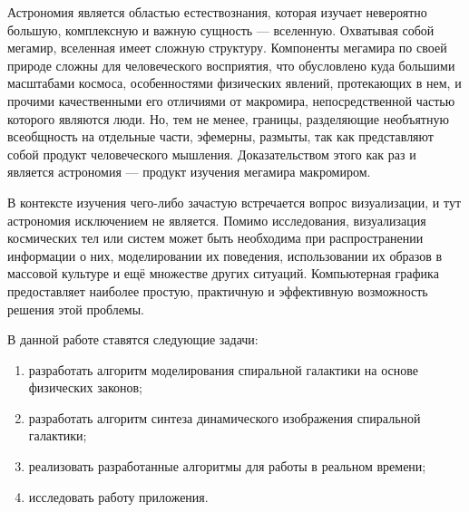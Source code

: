 \Introduction

Астрономия является областью естествознания, которая изучает невероятно большую, комплексную и важную сущность — вселенную. Охватывая собой мегамир, вселенная имеет сложную структуру. Компоненты мегамира по своей природе сложны для человеческого восприятия, что обусловлено куда большими масштабами космоса, особенностями физических явлений, протекающих в нем, и прочими качественными его отличиями от макромира, непосредственной частью которого являются люди. Но, тем не менее, границы, разделяющие необъятную всеобщность на отдельные части, эфемерны, размыты, так как представляют собой продукт человеческого мышления. Доказательством этого как раз и является астрономия — продукт изучения мегамира макромиром.

В контексте изучения чего-либо зачастую встречается вопрос визуализации, и тут астрономия исключением не является. Помимо исследования, визуализация космических тел или систем может быть необходима при распространении информации о них, моделировании их поведения, использовании их образов в массовой культуре и ещё множестве других ситуаций. Компьютерная графика предоставляет наиболее простую, практичную и эффективную возможность решения этой проблемы.

В данной работе ставятся следующие задачи:

\begin{enumerate}
    \item разработать алгоритм моделирования спиральной галактики на основе физических законов;
    \item разработать алгоритм синтеза динамического изображения спиральной галактики;
    \item реализовать разработанные алгоритмы для работы в реальном времени;
    \item исследовать работу приложения.
\end{enumerate}
